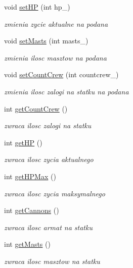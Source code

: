 \begin{DoxyCompactItemize}
void \hyperlink{class_ship_a53ac9d01792ca3cdbc7c35e38240867a}{set\+HP} (int hp\+\_\+)
\begin{DoxyCompactList}\small\item\em zmienia zycie aktualne na podana \end{DoxyCompactList}\item 
void \hyperlink{class_ship_a740a100b66b4f2ee628994c0c16da24b}{set\+Masts} (int masts\+\_\+)
\begin{DoxyCompactList}\small\item\em zmienia ilosc masztow na podana \end{DoxyCompactList}\item 
void \hyperlink{class_ship_a3b79ef24977758ea65b543dd30a7b008}{set\+Count\+Crew} (int countcrew\+\_\+)
\begin{DoxyCompactList}\small\item\em zmienia ilosc zalogi na statku na podana \end{DoxyCompactList}\item 
int \hyperlink{class_ship_a1da55c7ad0c972527a122e0bccc07fcd}{get\+Count\+Crew} ()
\begin{DoxyCompactList}\small\item\em zwraca ilosc zalogi na statku \end{DoxyCompactList}\item 
int \hyperlink{class_ship_ae99c45d37b4d1bd79a74d4745251b59c}{get\+HP} ()
\begin{DoxyCompactList}\small\item\em zwraca ilosc zycia aktualnego \end{DoxyCompactList}\item 
int \hyperlink{class_ship_accc55a9b14a92fb41ac2d3ebe80e23e5}{get\+H\+P\+Max} ()
\begin{DoxyCompactList}\small\item\em zwraca ilosc zycia maksymalnego \end{DoxyCompactList}\item 
int \hyperlink{class_ship_a7a9dc5f45fa613557853925235a3a752}{get\+Cannons} ()
\begin{DoxyCompactList}\small\item\em zwraca ilosc armat na statku \end{DoxyCompactList}\item 
int \hyperlink{class_ship_a937ffa88e426e8b0bb0006314111d1d2}{get\+Masts} ()
\begin{DoxyCompactList}\small\item\em zwraca ilosc masztow na statku \end{DoxyCompactList}\item 

\end{DoxyCompactItemize}
